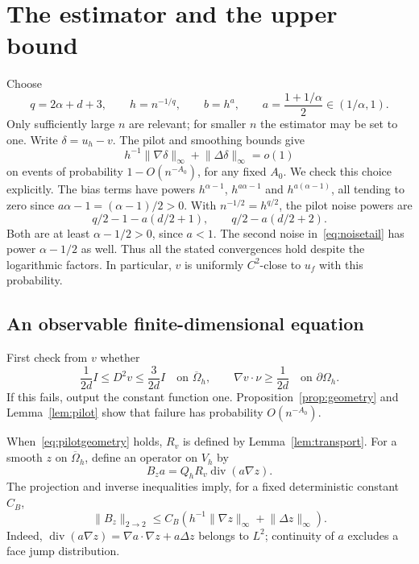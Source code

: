 \documentclass[11pt]{article}
\theoremstyle{remark}
\newcommand{\diver}{\operatorname{div}}
\newcommand{\norm}[1]{\lVert #1\rVert}
\begin{document}
\section{The estimator and the upper bound}\label{sec:upper}
Choose
\begin{equation}\label{eq:bandwidths}
 q=2\alpha+d+3,\qquad h=n^{-1/q},\qquad
 b=h^a,\qquad a=\frac{1+1/\alpha}{2}\in(1/\alpha,1).
\end{equation}
Only sufficiently large $n$ are relevant; for smaller $n$ the estimator may be set to one. Write $\delta=u_h-v$. The pilot and smoothing bounds give
\begin{equation}\label{eq:deltasmall}
 h^{-1}\norm{\nabla\delta}_\infty+\norm{\Delta\delta}_\infty=o(1)
\end{equation}
on events of probability $1-O(n^{-A_0})$, for any fixed $A_0$. We check this choice explicitly. The bias terms have powers $h^{\alpha-1}$, $h^{a\alpha-1}$ and $h^{a(\alpha-1)}$, all tending to zero since $a\alpha-1=(\alpha-1)/2>0$. With $n^{-1/2}=h^{q/2}$, the pilot noise powers are
\[
 q/2-1-a(d/2+1),\qquad q/2-a(d/2+2).
\]
Both are at least $\alpha-1/2>0$, since $a<1$. The second noise in~\eqref{eq:noisetail} has power $\alpha-1/2$ as well. Thus all the stated convergences hold despite the logarithmic factors. In particular, $v$ is uniformly $C^2$-close to $u_f$ with this probability.

\subsection{An observable finite-dimensional equation}
First check from $v$ whether
\begin{equation}\label{eq:pilotgeometry}
 \frac1{2d}I\le D^2v\le\frac3{2d}I\quad\text{on }\overline\Omega_h,
 \qquad \nabla v\cdot\nu\ge\frac1{2d}\quad\text{on }\partial\Omega_h.
\end{equation}
If this fails, output the constant function one. Proposition~\ref{prop:geometry} and Lemma~\ref{lem:pilot} show that failure has probability $O(n^{-A_0})$.

When~\eqref{eq:pilotgeometry} holds, $R_v$ is defined by Lemma~\ref{lem:transport}. For a smooth $z$ on $\overline\Omega_h$, define an operator on $V_h$ by
\begin{equation}\label{eq:B}
 B_z a=Q_hR_v\diver(a\nabla z).
\end{equation}
The projection and inverse inequalities imply, for a fixed deterministic constant $C_B$,
\begin{equation}\label{eq:Bbound}
 \norm{B_z}_{2\to2}
 \le C_B\left(h^{-1}\norm{\nabla z}_\infty+\norm{\Delta z}_\infty\right).
\end{equation}
Indeed, $\diver(a\nabla z)=\nabla a\cdot\nabla z+a\Delta z$ belongs to $L^2$; continuity of $a$ excludes a face jump distribution.
\end{document}
